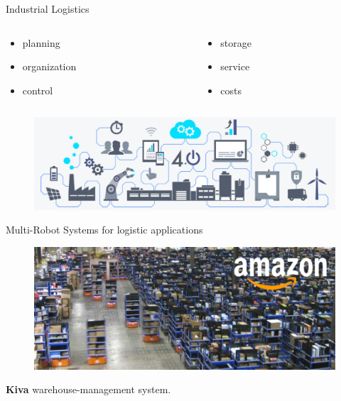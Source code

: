 
    \begin{frame}[fragile]{Industrial Logistics}
        \begin{columns}
            \begin{column}{.25\textwidth}
                \begin{itemize}
                \item  planning
                \item  organization
                \item  control
                \end{itemize} 
            \end{column}
            \begin{column}{.25\textwidth}
                \begin{itemize}
                    \item storage
                    \item service
                    \item costs
                \end{itemize}
            \end{column}
        \end{columns}
        \addvspace{0.6cm}
        \begin{figure}[hbt]
            \centering
            \includegraphics[width=\textwidth]{img/ind4.png}
        \end{figure}
    \end{frame}

    \begin{frame}[fragile]{Multi-Robot Systems for logistic applications}

        \begin{figure}[hbt]
            \centering
            \includegraphics[width=\textwidth]{img/kiva.png}
        \end{figure}
        
        \begin{center}
        {\bf Kiva} warehouse-management system.
        \end{center}
    \end{frame}

